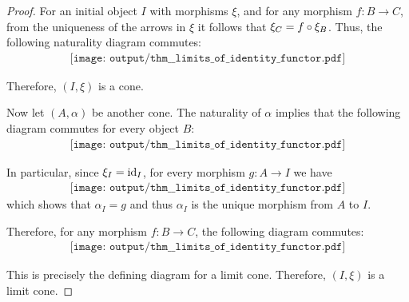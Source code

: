 \begin{proof}
   For an initial object \( I \) with morphisms \( \xi \), and for any morphism \( f: B \to C \), from the uniqueness of the arrows in \( \xi \) it follows that \( \xi_C = f \bincirc \xi_B \). Thus, the following naturality diagram commutes:
  \begin{equation}\label{eq:def:thm:limits_of_identity_functor/initial_object_is_limit/nat}
    \begin{aligned}
      \texttt{[image: output/thm\_\_limits\_of\_identity\_functor.pdf]}
    \end{aligned}
  \end{equation}

  Therefore, \( (I, \xi) \) is a cone.

  Now let \( (A, \alpha) \) be another cone. The naturality of \( \alpha \) implies that the following diagram commutes for every object \( B \):
  \begin{equation}\label{eq:def:thm:limits_of_identity_functor/initial_object_is_limit/half_limit}
    \begin{aligned}
      \texttt{[image: output/thm\_\_limits\_of\_identity\_functor.pdf]}
    \end{aligned}
  \end{equation}

  In particular, since \( \xi_I = \operatorname{id}_I \), for every morphism \( g: A \to I \) we have
  \begin{equation}\label{eq:def:thm:limits_of_identity_functor/initial_object_is_limit/cone_morphism_uniqueness}
    \begin{aligned}
      \texttt{[image: output/thm\_\_limits\_of\_identity\_functor.pdf]}
    \end{aligned}
  \end{equation}
  which shows that \( \alpha_I = g \) and thus \( \alpha_I \) is the unique morphism from \( A \) to \( I \).

  Therefore, for any morphism \( f: B \to C \), the following diagram commutes:
  \begin{equation}\label{eq:def:thm:limits_of_identity_functor/initial_object_is_limit/limit}
    \begin{aligned}
      \texttt{[image: output/thm\_\_limits\_of\_identity\_functor.pdf]}
    \end{aligned}
  \end{equation}

  This is precisely the defining diagram for a limit cone. Therefore, \( (I, \xi) \) is a limit cone.


\end{proof}
